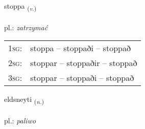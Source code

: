 \documentclass[frontgrid, backgrid]{flacards}\usepackage[]{graphicx}\usepackage[]{xcolor}
\begin{document}
\renewcommand{\flhead}{\vskip5pt \fboxsep=0pt {\small\bfseries\footnotesize Sagnorð | czasownik}}
\renewcommand{\fcfoot}{\vskip5pt \fboxsep=0pt \hspace{2pt}{\small\bfseries\footnotesize 3K}}

\renewcommand{\blhead}{\vskip5pt {\small\bfseries\footnotesize Sagnorð | czasownik }}
\renewcommand{\bcfoot}{\vskip5pt \hspace{2pt}{\small\bfseries\footnotesize 3K}}


{stoppa \small{\textsubscript{(\textit{v.})}} \\[1ex] %
\textphonetic{[stɔhpa]} \\
pl.: \emph{zatrzymać} \\  [2ex]
\renewcommand*{\arraystretch}{0.8}
\begin{tabular}{p{1cm}l}
\textsc{1sg}: & stoppa -- stoppaði -- stoppað \\ 
\textsc{2sg}: & stoppar -- stoppaðir -- stoppað \\ 
\textsc{3sg}: & stoppar -- stoppaði -- stoppað \\ 
\end{tabular}
}

\renewcommand{\flhead}{\vskip5pt \fboxsep=0pt {\small\bfseries\footnotesize Nafnorð | rzeczownik}}
\renewcommand{\fcfoot}{\vskip5pt \fboxsep=0pt \hspace{2pt}{\small\bfseries\footnotesize 3K}}

\renewcommand{\blhead}{\vskip5pt {\small\bfseries\footnotesize Nafnorð | rzeczownik }}
\renewcommand{\bcfoot}{\vskip5pt \hspace{2pt}{\small\bfseries\footnotesize 3K}}


{eldsneyti \small{\textsubscript{(\textit{n.})}} \\[1ex] %
\textphonetic{[ɛltstneitɪ]} \\
pl.: \emph{paliwo} \\  [2ex]
\renewcommand*{\arraystretch}{0.8}
}
\end{document}
